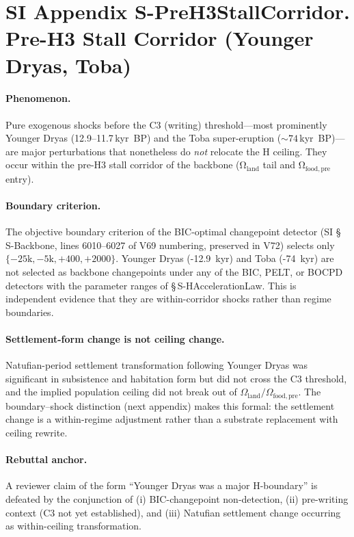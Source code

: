 \documentclass[11pt]{article}
\begin{document}
\section*{SI Appendix S-PreH3StallCorridor. Pre-H3 Stall Corridor (Younger Dryas, Toba)}
\label{sec:S-PreH3StallCorridor}

\paragraph{Phenomenon.} Pure exogenous shocks before the C3 (writing) threshold---most prominently Younger Dryas (12.9--11.7\,kyr~BP) and the Toba super-eruption ($\sim\!74$\,kyr~BP)---are major perturbations that nonetheless do \emph{not} relocate the H ceiling. They occur within the pre-H3 stall corridor of the backbone (Ω$_{\mathrm{land}}$ tail and Ω$_{\mathrm{food,pre}}$ entry).

\paragraph{Boundary criterion.} The objective boundary criterion of the BIC-optimal changepoint detector (SI \S\,S-Backbone, lines 6010--6027 of V69 numbering, preserved in V72) selects only $\{-25\mathrm{k}, -5\mathrm{k}, +400, +2000\}$. Younger Dryas (-12.9~kyr) and Toba (-74~kyr) are not selected as backbone changepoints under any of the BIC, PELT, or BOCPD detectors with the parameter ranges of \S\,S-HAccelerationLaw. This is independent evidence that they are within-corridor shocks rather than regime boundaries.

\paragraph{Settlement-form change is not ceiling change.} Natufian-period settlement transformation following Younger Dryas was significant in subsistence and habitation form but did not cross the C3 threshold, and the implied population ceiling did not break out of $\Omega_{\mathrm{land}}/\Omega_{\mathrm{food,pre}}$. The boundary--shock distinction (next appendix) makes this formal: the settlement change is a within-regime adjustment rather than a substrate replacement with ceiling rewrite.

\paragraph{Rebuttal anchor.} A reviewer claim of the form ``Younger Dryas was a major H-boundary'' is defeated by the conjunction of (i) BIC-changepoint non-detection, (ii) pre-writing context (C3 not yet established), and (iii) Natufian settlement change occurring as within-ceiling transformation.
\end{document}
